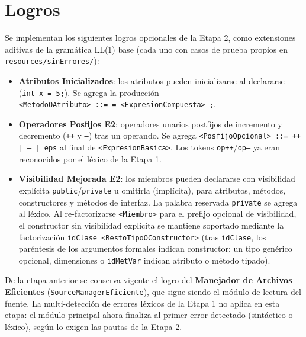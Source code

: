 \documentclass[11pt,a4paper]{article}
\begin{document}
\section{Logros}

Se implementan los siguientes logros opcionales de la Etapa 2, como extensiones
aditivas de la gramática LL(1) base (cada uno con casos de prueba propios en
\texttt{resources/sinErrores/}):

\begin{itemize}
  \item \textbf{Atributos Inicializados}: los atributos pueden inicializarse al
        declararse (\texttt{int x = 5;}). Se agrega la producción\\
        \texttt{<MetodoOAtributo> ::= = <ExpresionCompuesta> ;}.
  \item \textbf{Operadores Posfijos E2}: operadores unarios postfijos de incremento y
        decremento (\texttt{++} y \texttt{--}) tras un operando. Se agrega
        \texttt{<PosfijoOpcional> ::= ++ | -- | eps} al final de
        \texttt{<ExpresionBasica>}. Los tokens \texttt{op++}/\texttt{op--} ya eran
        reconocidos por el léxico de la Etapa 1.
  \item \textbf{Visibilidad Mejorada E2}: los miembros pueden declararse con
        visibilidad explícita \texttt{public}/\texttt{private} u omitirla (implícita),
        para atributos, métodos, constructores y métodos de interfaz. La palabra
        reservada \texttt{private} se agrega al léxico. Al re-factorizarse
        \texttt{<Miembro>} para el prefijo opcional de visibilidad, el constructor sin
        visibilidad explícita se mantiene soportado mediante la factorización
        \texttt{idClase <RestoTipoOConstructor>} (tras \texttt{idClase}, los paréntesis
        de los argumentos formales indican constructor; un tipo genérico opcional,
        dimensiones o \texttt{idMetVar} indican atributo o método tipado).
\end{itemize}

De la etapa anterior se conserva vigente
el logro del \textbf{Manejador de Archivos Eficientes}
(\texttt{SourceManagerEficiente}), que sigue siendo el módulo de lectura del fuente. La
multi-detección de errores léxicos de la Etapa 1 no aplica en esta etapa: el módulo
principal ahora finaliza al primer error detectado (sintáctico o léxico), según lo
exigen las pautas de la Etapa 2.
\end{document}
